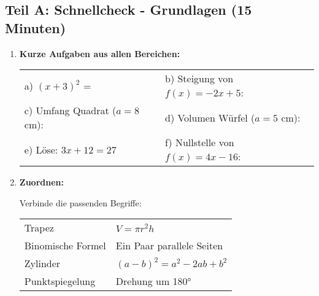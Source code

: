 \subsection*{Teil A: Schnellcheck - Grundlagen (15 Minuten)}

\begin{enumerate}[label=\arabic*.]

    \item \textbf{Kurze Aufgaben aus allen Bereichen:}

    \begin{tabular}{ll}
        a) $(x + 3)^2$ = \underline{\hspace{4cm}} & b) Steigung von $f(x) = -2x + 5$: \underline{\hspace{2cm}} \\[2ex]
        c) Umfang Quadrat ($a = 8$ cm): \underline{\hspace{3cm}} & d) Volumen Würfel ($a = 5$ cm): \underline{\hspace{3cm}} \\[2ex]
        e) Löse: $3x + 12 = 27$ \underline{\hspace{4cm}} & f) Nullstelle von $f(x) = 4x - 16$: \underline{\hspace{3cm}}
    \end{tabular}

    \vspace{1cm}

    \item \textbf{Zuordnen:}

    Verbinde die passenden Begriffe:

    \begin{tabular}{ll}
        Trapez & \hspace{3cm} $V = \pi r^2 h$ \\[0.5cm]
        Binomische Formel & \hspace{3cm} Ein Paar parallele Seiten \\[0.5cm]
        Zylinder & \hspace{3cm} $(a-b)^2 = a^2 - 2ab + b^2$ \\[0.5cm]
        Punktspiegelung & \hspace{3cm} Drehung um 180° \\
    \end{tabular}

\end{enumerate}